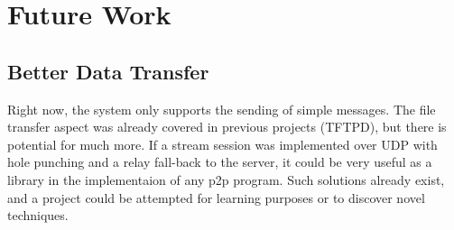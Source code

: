 \documentclass{article}
\begin{document}
\section{Future Work}
\subsection{Better Data Transfer}
Right now, the system only supports the sending of simple messages. The file transfer aspect was already covered in previous projects (TFTPD), but there is potential for much more. If a stream session was implemented over UDP with hole punching and a relay fall-back to the server, it could be very useful as a library in the implementaion of any p2p program. Such solutions already exist, and a project could be attempted for learning purposes or to discover novel techniques.



\end{document}
